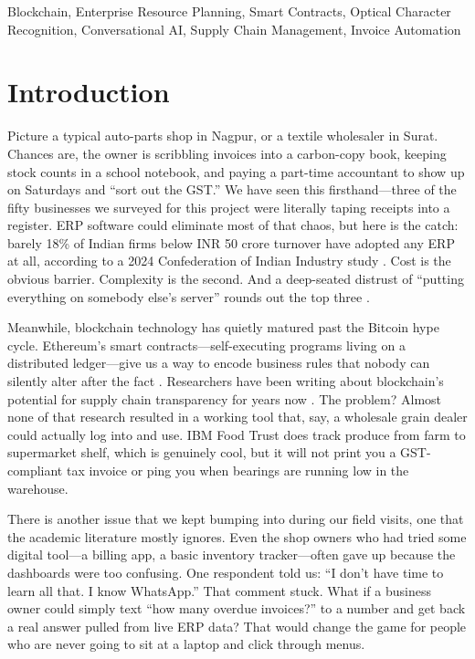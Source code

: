 \documentclass[conference]{IEEEtran}
\begin{document}
\begin{IEEEkeywords}
Blockchain, Enterprise Resource Planning, Smart Contracts, Optical Character Recognition, Conversational AI, Supply Chain Management, Invoice Automation
\end{IEEEkeywords}

\section{Introduction}

Picture a typical auto-parts shop in Nagpur, or a textile wholesaler in Surat. Chances are, the owner is scribbling invoices into a carbon-copy book, keeping stock counts in a school notebook, and paying a part-time accountant to show up on Saturdays and ``sort out the GST.'' We have seen this firsthand---three of the fifty businesses we surveyed for this project were literally taping receipts into a register. ERP software could eliminate most of that chaos, but here is the catch: barely 18\% of Indian firms below INR 50 crore turnover have adopted any ERP at all, according to a 2024 Confederation of Indian Industry study \cite{b2}. Cost is the obvious barrier. Complexity is the second. And a deep-seated distrust of ``putting everything on somebody else's server'' rounds out the top three \cite{b1}.

Meanwhile, blockchain technology has quietly matured past the Bitcoin hype cycle. Ethereum's smart contracts---self-executing programs living on a distributed ledger---give us a way to encode business rules that nobody can silently alter after the fact \cite{b3}. Researchers have been writing about blockchain's potential for supply chain transparency for years now \cite{b4}\cite{b7}. The problem? Almost none of that research resulted in a working tool that, say, a wholesale grain dealer could actually log into and use. IBM Food Trust \cite{b8} does track produce from farm to supermarket shelf, which is genuinely cool, but it will not print you a GST-compliant tax invoice or ping you when bearings are running low in the warehouse.

There is another issue that we kept bumping into during our field visits, one that the academic literature mostly ignores. Even the shop owners who had tried some digital tool---a billing app, a basic inventory tracker---often gave up because the dashboards were too confusing. One respondent told us: ``I don't have time to learn all that. I know WhatsApp.'' That comment stuck. What if a business owner could simply text ``how many overdue invoices?'' to a number and get back a real answer pulled from live ERP data? That would change the game for people who are never going to sit at a laptop and click through menus.
\end{document}
